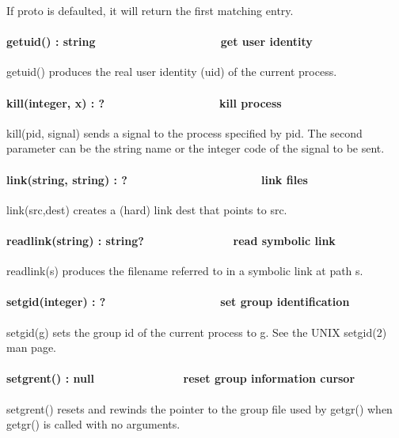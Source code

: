 If proto is defaulted, it will return the first matching entry. 

\paragraph[getuid() : string \ \ \ \ \ \ \ \ \ \ \ \ \ \  \ \ \ \ \ get
user identity]{getuid() : string \ \ \ \ \ \ \ \ \ \ \ \ \ \ 
\ \ \ \ \ get user identity}
getuid() produces the real user identity (uid) of the current process. 

\paragraph[kill(integer, x) : ?\ \ \ \ \ \ \ \ \ \ \ \ \ \ \ \  \ \ kill
process]{kill(integer, x) : ?\ \ \ \ \ \ \ \ \ \ \ \ \ \ \ \  \ \ kill
process}
kill(pid, signal) sends a signal to the process specified by pid. The
second parameter can be the string name or the integer code of the
signal to be sent.

\paragraph[link(string, string) : ?\ \ \ \ \ \ \ \ \ \ \ \ \ \ 
\ \ \ \ \ \ \ link files]{link(string, string) :
?\ \ \ \ \ \ \ \ \ \ \ \ \ \  \ \ \ \ \ \ \ link files}
\index{link!file system}link(src,dest) creates a (hard) link dest that
points to src.

\paragraph[readlink(string) : string?\ \ \ \ \ \ \ \ \ \ \ \  \ \ read
symbolic link]{readlink(string) : string?\ \ \ \ \ \ \ \ \ \ \ \ 
\ \ read symbolic link}
readlink(s) produces the filename referred to in a symbolic link at path
s.

\paragraph[setgid(integer) : ?\ \ \ \ \ \ \ \ \ \ \ \  \ \ \ \ \ \ set
group identification]{setgid(integer) : ?\ \ \ \ \ \ \ \ \ \ \ \ 
\ \ \ \ \ \ set group identification}
setgid(g) sets the group id of the current process to g. See the UNIX
setgid(2) man page. 

\paragraph[setgrent() : null\ \ \ \ \ \ \ \ \ \  \ \ \ \ reset group
information cursor]{setgrent() : null\ \ \ \ \ \ \ \ \ \  \ \ \ \ reset
group information cursor}
setgrent() resets and rewinds the pointer to the group file used by
getgr() when getgr() is called with no arguments. 

